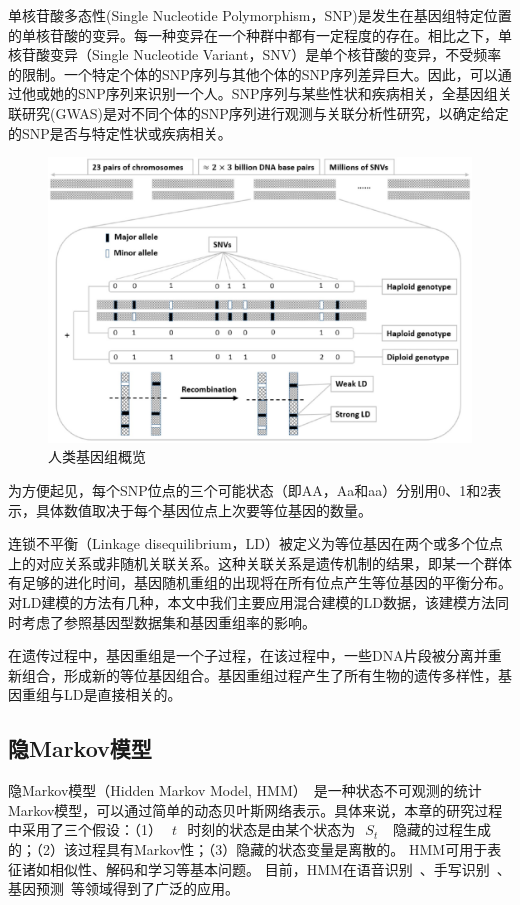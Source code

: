 单核苷酸多态性(Single Nucleotide Polymorphism，SNP)是发生在基因组特定位置的单核苷酸的变异。每一种变异在一个种群中都有一定程度的存在。相比之下，单核苷酸变异（Single Nucleotide Variant，SNV）是单个核苷酸的变异，不受频率的限制。一个特定个体的SNP序列与其他个体的SNP序列差异巨大。因此，可以通过他或她的SNP序列来识别一个人。SNP序列与某些性状和疾病相关，全基因组关联研究(GWAS)是对不同个体的SNP序列进行观测与关联分析性研究，以确定给定的SNP是否与特定性状或疾病相关。

\begin{figure}[htbp]
	\centering
	\includegraphics[width = 0.9\linewidth]{./figures/Fig1-human-genomic-overview.eps}
	\caption{人类基因组概览~\cite{samani2015quantifying}
	}
	\label{fig:human-genomic-overview}
\end{figure}

为方便起见，每个SNP位点的三个可能状态（即AA，Aa和aa）分别用0、1和2表示，具体数值取决于每个基因位点上次要等位基因的数量。

连锁不平衡（Linkage disequilibrium，LD）被定义为等位基因在两个或多个位点上的对应关系或非随机关联关系。这种关联关系是遗传机制的结果，即某一个群体有足够的进化时间，基因随机重组的出现将在所有位点产生等位基因的平衡分布。对LD建模的方法有几种，本文中我们主要应用混合建模的LD数据，该建模方法同时考虑了参照基因型数据集和基因重组率的影响。

在遗传过程中，基因重组是一个子过程，在该过程中，一些DNA片段被分离并重新组合，形成新的等位基因组合。基因重组过程产生了所有生物的遗传多样性，基因重组与LD是直接相关的。

\subsection{隐Markov模型}

隐Markov模型（Hidden Markov Model, HMM）~\cite{rabiner1989tutorial,stamp2004revealing}是一种状态不可观测的统计Markov模型，可以通过简单的动态贝叶斯网络表示。具体来说，本章的研究过程中采用了三个假设：（1）~$~t~$~时刻的状态是由某个状态为~$~S_t~$~ 隐藏的过程生成的；（2）该过程具有Markov性；（3）隐藏的状态变量是离散的。
HMM可用于表征诸如相似性、解码和学习等基本问题。 目前，HMM在语音识别~\cite{rabiner1989tutorial}、手写识别~\cite{hu1996hmm}、基因预测~\cite{durbin1998biological}等领域得到了广泛的应用。

